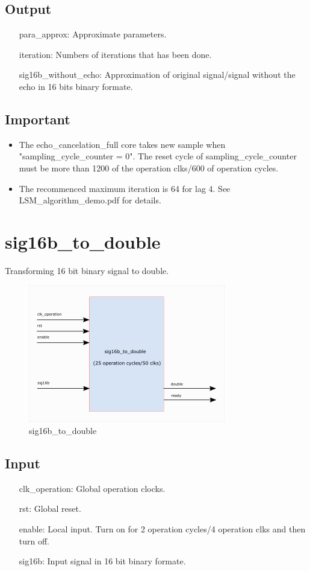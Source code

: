 \documentclass[twoside,a4paper]{refart}
\begin{document}
\subsection{Output}
\begin{itemize}
	\item[para\_approx:] Approximate parameters.
	\item[iteration:] Numbers of iterations that has been done.
	\item[sig16b\_without\_echo:] Approximation of original signal/signal without the echo in 16 bits binary formate.
\end{itemize}
\subsection{Important}
\begin{itemize}
	\item The echo\_cancelation\_full core takes new sample when "sampling\_cycle\_counter = 0". The reset cycle of sampling\_cycle\_counter must be more than 1200 of the operation clks/600 of operation cycles.
	\item The recommenced maximum iteration is 64 for lag 4. See LSM\_algorithm\_demo.pdf for details.
\end{itemize}
\section{sig16b\_to\_double}
Transforming 16 bit binary signal to double.
\begin{figure}[H]
	\centering
	\includegraphics[scale=1.2]{sig16b_to_double.png}
	\caption{sig16b\_to\_double}
	\label{}
\end{figure}
\subsection{Input}
\begin{itemize}
	\item[clk\_operation:] Global operation clocks.
	\item[rst:   ] Global reset.
	\item[enable:] Local input. Turn on for 2 operation cycles/4 operation clks and then turn off.
	\item[sig16b:] Input signal in 16 bit binary formate.
\end{itemize}
\end{document}
